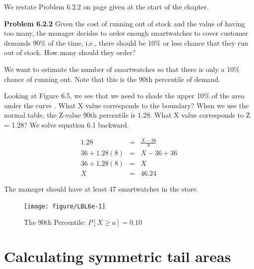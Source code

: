 \documentclass[11pt, chapterprefix=true]{scrbook}\usepackage[]{graphicx}\usepackage[]{color}
\begin{document}
We restate Problem 6.2.2 on page \pageref{LBL622} given at the start of the chapter.

\textbf{Problem 6.2.2}  Given the cost of running out of stock and the value of having too many, the manager decides to order enough smartwatches to cover customer demands 90\% of the time, i.e., there should be 10\% or less chance that they run out of stock.  How many should they order?

We want to estimate the number of smartwatches so that there is only a 10\% chance of running out.  Note that this is the 90th percentile of demand.

Looking at Figure 6.5, we see that we need to shade the upper 10\% of the area under the curve  .  What X value corresponds to the boundary?  When we use the normal table, the Z-value 90th percentile is 1.28.  What X value corresponds to Z = 1.28?  We solve equation 6.1 backward.

\begin{eqnarray*}
1.28 & = & \frac{X - 36}{8}  \\
36 + 1.28(8) & = & X-36 + 36  \\
36 + 1.28(8) & = & X  \\
X & = & 46.24 
\end{eqnarray*}

\newpage

The manager should have at least 47 smartwatches in the store.

\begin{figure}[ht]

\caption{The 90th Percentile: $P[X \ge a] = 0.10$ }




{\centering \texttt{[image: figure/LBL6e-1]} 

}




\end{figure}


\section{Calculating symmetric tail areas}
\end{document}
